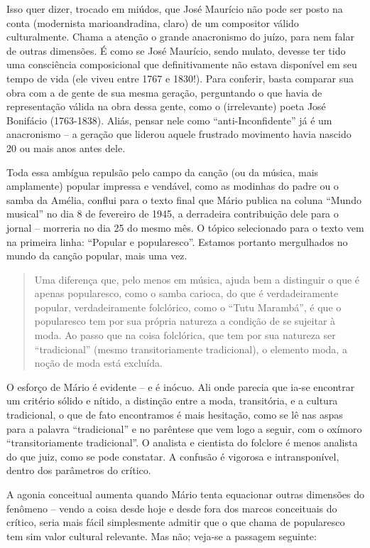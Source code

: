 Isso quer dizer, trocado em miúdos, que José Maurício não pode ser posto
na conta (modernista marioandradina, claro) de um compositor válido
culturalmente. Chama a atenção o grande anacronismo do juízo, para nem
falar de outras dimensões. É como se José Maurício, sendo mulato,
devesse ter tido uma consciência composicional que definitivamente não
estava disponível em seu tempo de vida (ele viveu entre 1767 e 1830!).
Para conferir, basta comparar sua obra com a de gente de sua mesma
geração, perguntando o que havia de representação válida na obra dessa
gente, como o (irrelevante) poeta José Bonifácio (1763-1838). Aliás,
pensar nele como ``anti-Inconfidente'' já é um anacronismo -- a geração
que liderou aquele frustrado movimento havia nascido 20 ou mais anos
antes dele.

Toda essa ambígua repulsão pelo campo da canção (ou da música, mais
amplamente) popular impressa e vendável, como as modinhas do padre ou o
samba da Amélia, conflui para o texto final que Mário publica na coluna
``Mundo musical'' no dia 8 de fevereiro de 1945, a derradeira
contribuição dele para o jornal -- morreria no dia 25 do mesmo mês. O
tópico selecionado para o texto vem na primeira linha: ``Popular e
popularesco''. Estamos portanto mergulhados no mundo da canção popular,
mais uma vez.

\begin{quote}
Uma diferença que, pelo menos em música, ajuda bem a distinguir o que é
apenas popularesco, como o samba carioca, do que é verdadeiramente
popular, verdadeiramente folclórico, como o ``Tutu Marambá'', é que o
popularesco tem por sua própria natureza a condição de se sujeitar à
moda. Ao passo que na coisa folclórica, que tem por sua natureza ser
``tradicional'' (mesmo transitoriamente tradicional), o elemento moda, a
noção de moda está excluída.
\end{quote}

O esforço de Mário é evidente -- e é inócuo. Ali onde parecia que ia-se
encontrar um critério sólido e nítido, a distinção entre a moda,
transitória, e a cultura tradicional, o que de fato encontramos é mais
hesitação, como se lê nas aspas para a palavra ``tradicional'' e no
parêntese que vem logo a seguir, com o oxímoro ``transitoriamente
tradicional''. O analista e cientista do folclore é menos analista do
que juiz, como se pode constatar. A confusão é vigorosa e
intransponível, dentro dos parâmetros do crítico.

A agonia conceitual aumenta quando Mário tenta equacionar outras
dimensões do fenômeno -- vendo a coisa desde hoje e desde fora dos
marcos conceituais do crítico, seria mais fácil simplesmente admitir que
o que chama de popularesco tem sim valor cultural relevante. Mas não;
veja-se a passagem seguinte:

